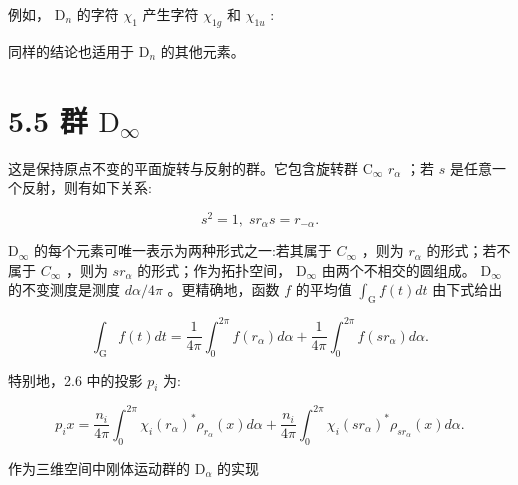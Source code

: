 \documentclass[10pt]{article}
\begin{document}
例如， \({\mathrm{D}}_{n}\) 的字符 \({\chi }_{1}\) 产生字符 \({\chi }_{1g}\) 和 \({\chi }_{1u}\) :

\begin{center}
\end{center}

同样的结论也适用于 \({\mathrm{D}}_{n}\) 的其他元素。

\section*{5.5 群 \({\mathrm{D}}_{\infty }\)}

这是保持原点不变的平面旋转与反射的群。它包含旋转群 \({\mathrm{C}}_{\infty }\)  \({r}_{\alpha }\) ；若 \(s\) 是任意一个反射，则有如下关系:

\[
{s}^{2} = 1,\;s{r}_{\alpha }s = {r}_{-\alpha }.
\]

\({\mathrm{D}}_{\infty }\) 的每个元素可唯一表示为两种形式之一:若其属于 \({C}_{\infty }\) ，则为 \({r}_{\alpha }\) 的形式；若不属于 \({C}_{\infty }\) ，则为 \(s{r}_{\alpha }\) 的形式；作为拓扑空间， \({\mathrm{D}}_{\infty }\) 由两个不相交的圆组成。 \({\mathrm{D}}_{\infty }\) 的不变测度是测度 \({d\alpha }/{4\pi }\) 。更精确地，函数 \(f\) 的平均值 \({\int }_{\mathrm{G}}f\left( t\right) {dt}\) 由下式给出

\[
{\int }_{\mathrm{G}}f\left( t\right) {dt} = \frac{1}{4\pi }{\int }_{0}^{2\pi }f\left( {r}_{\alpha }\right) {d\alpha } + \frac{1}{4\pi }{\int }_{0}^{2\pi }f\left( {s{r}_{\alpha }}\right) {d\alpha }.
\]

特别地，2.6 中的投影 \({p}_{i}\) 为:

\[
{p}_{i}x = \frac{{n}_{i}}{4\pi }{\int }_{0}^{2\pi }{\chi }_{i}{\left( {r}_{\alpha }\right) }^{ * }{\rho }_{{r}_{\alpha }}\left( x\right) {d\alpha } + \frac{{n}_{i}}{4\pi }{\int }_{0}^{2\pi }{\chi }_{i}{\left( s{r}_{\alpha }\right) }^{ * }{\rho }_{s{r}_{\alpha }}\left( x\right) {d\alpha }.
\]

作为三维空间中刚体运动群的 \({\mathrm{D}}_{\alpha }\) 的实现
\end{document}
